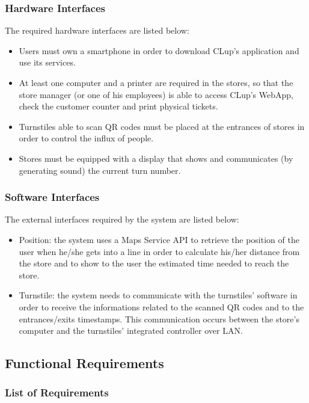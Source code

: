 \documentclass{article}
\begin{document}
\subsubsection{Hardware Interfaces}
The required hardware interfaces are listed below:
\begin{itemize}
\item Users must own a smartphone in order to download CLup’s application and use its services.
\item At least one computer and a printer are required in the stores, so that the store manager (or one of his employees) is able to access CLup’s WebApp, check the customer counter and print physical tickets.
\item Turnstiles able to scan QR codes must be placed at the entrances of stores in order to control the influx of people.
\item Stores must be equipped with a display that shows and communicates (by generating sound) the current turn number.
\end{itemize}
\subsubsection{Software Interfaces}
The external interfaces required by the system are listed below:
\begin{itemize}
\item Position: the system uses a Maps Service API to retrieve the position of the user when he/she gets into a line in order to calculate his/her distance from the store and to show to the user the estimated time needed to reach the store.
\item Turnstile: the system needs to communicate with the turnstiles' software in order to receive the informations related to the scanned QR codes and to the entrances/exits timestamps. This communication occurs between the store's computer and the turnstiles' integrated controller over LAN.
\end{itemize}
\subsection{Functional Requirements}
\subsubsection{List of Requirements}
\end{document}

